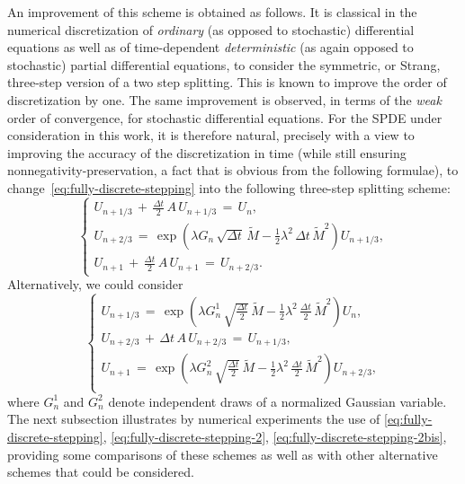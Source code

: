 \documentclass[12pt]{article}
\begin{document}
{An improvement of this scheme is obtained as follows. It is classical in the numerical discretization of \emph{ordinary} (as opposed to stochastic) differential equations as well as of time-dependent  \emph{deterministic} (as again opposed to stochastic) partial differential equations, to consider the symmetric, or Strang, three-step version of a two step splitting. This is known to improve the order of discretization by one. The same improvement is observed, in terms of the \emph{weak} order of convergence, for stochastic differential equations. For the SPDE under consideration in this work, it is therefore natural, precisely with a view to improving the accuracy of the discretization in time (while still ensuring nonnegativity-preservation, a fact that is obvious from the following formulae), to change~\eqref{eq:fully-discrete-stepping} into the following three-step splitting scheme:
\begin{equation}
\label{eq:fully-discrete-stepping-2}
  \left\{
  \begin{array}{l}
  \displaystyle  U_{n+1/3}\, + \,\frac{\Delta t}{2} \,A\,U_{n+1/3} \,= \,  U_{n},\\
   U_{n+2/3}\,=\, \exp \left(\lambda G_n\, \sqrt{\Delta t} \, \tilde{M} - \frac{1}{2} \lambda^2\, \Delta t \,\tilde{M}^{2} \right) U_{n+1/3},\\
     \displaystyle  U_{n+1}\, + \,\frac{\Delta t}{2} \,A\,U_{n+1} \,= \,  U_{n+2/3}.
    \end{array}
\right.
\end{equation}
Alternatively, we could consider
\begin{equation}
\label{eq:fully-discrete-stepping-2bis}
  \left\{
  \begin{array}{l}
   \displaystyle  U_{n+1/3}\,=\, \exp \left(\lambda G^1_n\, \sqrt{\frac{\Delta t}{2}} \, \tilde{M} - \frac{1}{2} \lambda^2\, \frac{\Delta t}{2} \,\tilde{M}^{2} \right) U_{n},\\
  \displaystyle  U_{n+2/3}\, + \,{\Delta t} \,A\,U_{n+2/3} \,= \,  U_{n+1/3},\\
   \displaystyle  U_{n+1}\,=\, \exp \left(\lambda G^2_n\, \sqrt{\frac{\Delta t}{2}} \, \tilde{M} - \frac{1}{2} \lambda^2\, \frac{\Delta t}{2} \,\tilde{M}^{2} \right) U_{n+2/3},\\
     \end{array}
\right.
\end{equation}
where $G^1_n$ and $G^2_n$ denote independent draws of a normalized Gaussian variable.
The next subsection illustrates by numerical experiments the use of \eqref{eq:fully-discrete-stepping}, \eqref{eq:fully-discrete-stepping-2}, \eqref{eq:fully-discrete-stepping-2bis}, providing some comparisons of these schemes as well as with other alternative schemes that could be considered. 

}
\end{document}
